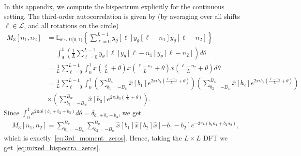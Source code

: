 \documentclass[english,12pt]{article}
\newcommand{\I}{\iota}
\newcommand{\tB}{B_w}
\newcommand{\E}{\mathbb{E}}
\numberwithin{equation}{section}
\numberwithin{thm}{section} %
\begin{document}
In this appendix, we compute the bispectrum explicitly for the continuous setting. The third-order autocorrelation is given by (by averaging over all shifts $\ell\in\mathcal{L}$, and all rotations on the circle)
\begin{equation}
\begin{split}
M_3[n_1,n_2] &= \E_{\theta\sim\text{U}[0,1)}\left\{ \sum_{\ell=0}^{L-1}  y_\theta[\ell] y_\theta[\ell-n_1] y_\theta[\ell-n_2]\right\} 
\\&=\int_{0}^{1}\left(\frac{1}{L}\sum_{\ell=0}^{L-1} y_\theta[\ell] y_\theta[\ell-n_1] y_\theta[\ell-n_2]\right)d\theta\\ 
&= \frac{1}{L}\sum_{\ell=0}^{L-1}\int_{0}^{1} x\left(\frac{\ell}{L} + \theta\right) x\left(\frac{\ell-n_1}{L} + \theta\right)
x\left(\frac{\ell-n_2}{L} + \theta\right)d\theta\\
&= \frac{1}{L}\sum_{\ell=0}^{L-1}\int_{0}^{1} 
\left(\sum_{b_1=-\tB}^{\tB}\hat{x}[b_1]e^{2\pi\I b_1 \left(\frac{\ell-n_1}{L} + \theta\right) }\right) 
\left(\sum_{b_2=-\tB}^{\tB}\hat{x}[b_2]e^{2\pi\I b_2 \left(\frac{\ell-n_2}{L} + \theta\right) } \right) \\
&\times \left(\sum_{b_3=-\tB}^{\tB}\hat{x}[b_3]e^{2\pi\I b_3 \left(\frac{\ell}{L} + \theta\right) }\right). 
\end{split}
\end{equation}
Since $\int_{0}^{1}e^{2\pi\I\theta(b_1+b_2+b_3)}d\theta=\delta_{b_1+b_2+b_3}$, we get 
\begin{equation}
\begin{split}
M_3[n_1,n_2] =   \sum_{b_1=-\tB}^{\tB}\sum_{b_2=-\tB}^{\tB} \hat{x}[b_1]\hat{x}[b_2]\hat{x}[-b_1-b_2]e^{-2\pi\I (b_1n_1+b_2n_2)},
\end{split}
\end{equation}
which is exactly~\eqref{eq:3rd_moment_zeros}. Hence, taking the $L\times L$ DFT we get~\eqref{eq:mixed_bispectra_zeros}.
\end{document}
